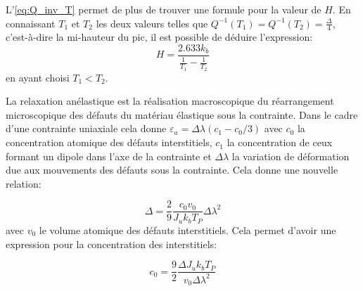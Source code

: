 L'\autoref{eq:Q_inv_T} permet de plus de trouver une formule pour la valeur de $H$. En connaissant $T_1$ et $T_2$ les deux valeurs telles que $Q^{-1}(T_1) = Q^{-1}(T_2) = \frac{\Delta}{4}$, c'est-à-dire la mi-hauteur du pic, il est possible de déduire l'expression:
\begin{equation}
    H = \frac{2.633 k_b}{\frac{1}{T_1} - \frac{1}{T_2}}
    \label{eq:H_mi_hauteur}
\end{equation}
en ayant choisi $T_1 < T_2$.


La relaxation anélastique est la réalisation macroscopique du réarrangement microscopique des défauts du matériau élastique sous la contrainte. Dans le cadre d'une contrainte uniaxiale cela donne \hbox{$\varepsilon_a = \Delta\lambda\left(c_1 - c_0/3\right)$} avec $c_0$ la concentration atomique des défauts interstitiels, $c_1$ la concentration de ceux formant un dipole dans l'axe de la contrainte et $\Delta\lambda$ la variation de déformation due aux mouvements des défauts sous la contrainte. Cela donne une nouvelle relation:

\begin{equation}
    \Delta = \frac{2}{9}\frac{c_0 v_0}{J_u k_b T_P}\Delta\lambda^2
    \label{eq:delta_defauts}
\end{equation}
avec $v_0$ le volume atomique des défauts interstitiels.
Cela permet d'avoir une expression pour la concentration des interstitiels:

\begin{equation}
    c_0 = \frac{9}{2}\frac{\Delta J_u k_b T_P}{v_0 \Delta \lambda^2}
    \label{eq:c_0}
\end{equation}

